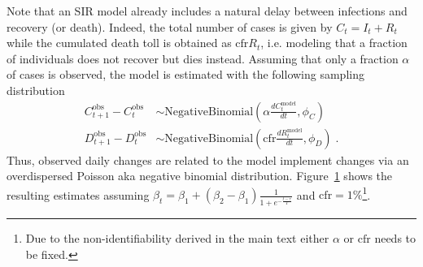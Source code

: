 \documentclass[fullpage,a4paper]{article}
\newcommand{\fig}[1]{Figure~\ref{fig:#1}}
\begin{document}
Note that an SIR model already includes a natural delay between
infections and recovery (or death). Indeed, the total number of cases
is given by $C_t = I_t + R_t$ while the cumulated death toll is
obtained as $\mathrm{cfr} R_t$, i.e. modeling that a fraction of
individuals does not recover but dies instead. Assuming that only a
fraction $\alpha$ of cases is observed, the model is estimated with
the following sampling distribution
\begin{align*}
  C^{\mathrm{obs}}_{t+1} - C^{\mathrm{obs}}_t &\sim \mathrm{NegativeBinomial}\left(\alpha \frac{dC^{\mathrm{model}}_t}{dt}, \phi_C \right) \\
  D^{\mathrm{obs}}_{t+1} - D^{\mathrm{obs}}_t &\sim \mathrm{NegativeBinomial}\left(\mathrm{cfr} \frac{dR^{\mathrm{model}}_t}{dt}, \phi_D \right) \; .
\end{align*}
Thus, observed daily changes are related to the model implement
changes via an overdispersed Poisson aka negative binomial
distribution. \fig{sir_fit} shows the resulting estimates assuming
$\beta_t = \beta_1 + (\beta_2 - \beta_1) \frac{1}{1 + e^{- \frac{t -
      \tau}{T} }}$ and $\mathrm{cfr} = 1\%$\footnote{Due to the
  non-identifiability derived in the main text either $\alpha$ or
  $\mathrm{cfr}$ needs to be fixed.}.

\begin{figure}
  
  \caption{\label{fig:sir_fit}}
  
\end{figure}
\end{document}
